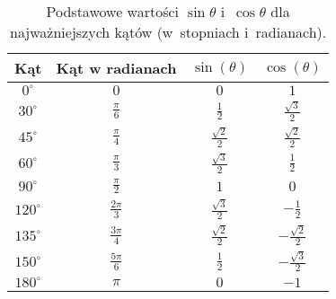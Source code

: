 \begin{table}[h!]
    \centering
    \begin{tabular}{c|c|c|c}
    \hline
    \textbf{Kąt} & \textbf{Kąt w radianach} & \(\sin(\theta)\) & \(\cos(\theta)\) \\
    \hline
    \(0^\circ\)   & \(0\)                   & \(0\)                  & \(1\)                   \\
    \(30^\circ\)  & \(\frac{\pi}{6}\)       & \(\frac{1}{2}\)        & \(\frac{\sqrt{3}}{2}\)  \\
    \(45^\circ\)  & \(\frac{\pi}{4}\)       & \(\frac{\sqrt{2}}{2}\) & \(\frac{\sqrt{2}}{2}\)  \\
    \(60^\circ\)  & \(\frac{\pi}{3}\)       & \(\frac{\sqrt{3}}{2}\) & \(\frac{1}{2}\)         \\
    \(90^\circ\)  & \(\frac{\pi}{2}\)       & \(1\)                  & \(0\)                   \\
    \(120^\circ\) & \(\frac{2\pi}{3}\)      & \(\frac{\sqrt{3}}{2}\) & \(-\tfrac{1}{2}\)       \\
    \(135^\circ\) & \(\frac{3\pi}{4}\)      & \(\tfrac{\sqrt{2}}{2}\)& \(-\tfrac{\sqrt{2}}{2}\)\\
    \(150^\circ\) & \(\frac{5\pi}{6}\)      & \(\tfrac{1}{2}\)       & \(-\tfrac{\sqrt{3}}{2}\)\\
    \(180^\circ\) & \(\pi\)                 & \(0\)                  & \(-1\)                  \\
    \hline
    \end{tabular}
    \caption{Podstawowe wartości \(\sin\theta\) i~\(\cos\theta\) dla najważniejszych kątów (w~stopniach i~radianach).}
    \label{tab:sin-cos-extended}
    \end{table}


